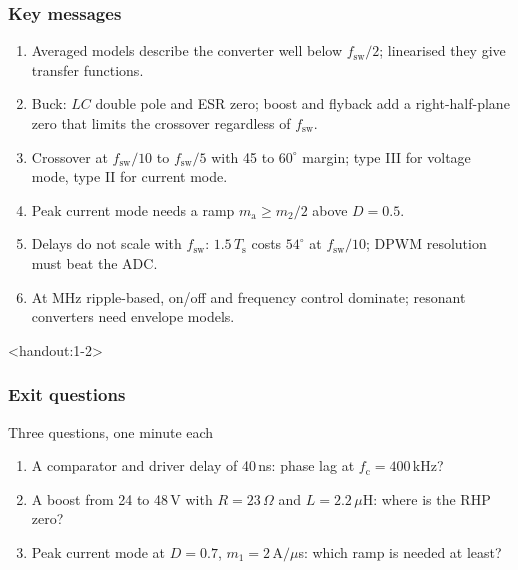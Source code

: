 \begin{frame}
	\frametitle{Key messages}
	\begin{enumerate}
		\item Averaged models describe the converter well below $f_\mathrm{sw}/2$; linearised they give transfer functions.
		\item Buck: $LC$ double pole and ESR zero; boost and flyback add a right-half-plane zero that limits the crossover regardless of $f_\mathrm{sw}$.
		\item Crossover at $f_\mathrm{sw}/10$ to $f_\mathrm{sw}/5$ with 45 to $60^\circ$ margin; type III for voltage mode, type II for current mode.
		\item Peak current mode needs a ramp $m_\mathrm{a}\geq m_2/2$ above $D=0.5$.
		\item Delays do not scale with $f_\mathrm{sw}$: $1.5\,T_\mathrm{s}$ costs $54^\circ$ at $f_\mathrm{sw}/10$; DPWM resolution must beat the ADC.
		\item At MHz ripple-based, on/off and frequency control dominate; resonant converters need envelope models.
	\end{enumerate}
\end{frame}

\begin{frame}<handout:1-2>
	\frametitle{Exit questions}
	\begin{varblock}[\textwidth]{Three questions, one minute each}
		\begin{enumerate}
			\item A comparator and driver delay of 40\,ns: phase lag at $f_\mathrm{c}=400$\,kHz?
			\item A boost from 24 to 48\,V with $R=23\,\Omega$ and $L=2.2\,\mu$H: where is the RHP zero?
			\item Peak current mode at $D=0.7$, $m_1=2\,\mathrm{A}/\mu$s: which ramp is needed at least?
		\end{enumerate}
	\end{varblock}
\end{frame}

